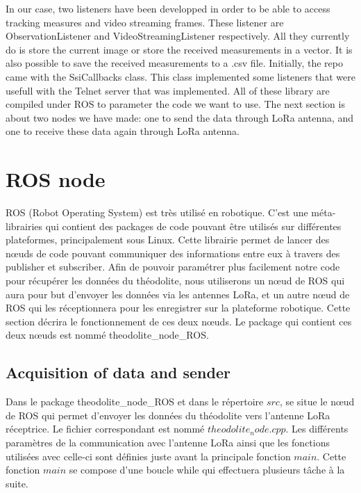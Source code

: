 \documentclass[10pt,letterpaper,oneside]{article}
\begin{document}
In our case, two listeners have been developped in order to be able to access tracking measures and video streaming frames. 
These listener are ObservationListener and VideoStreamingListener respectively. 
All they currently do is store the current image or store the received measurements in a vector. 
It is also possible to save the received measurements to a .csv file.
Initially, the repo came with the SsiCallbacks class. 
This class implemented some listeners that were usefull with the Telnet server that was implemented.
All of these library are compiled under ROS to parameter the code we want to use.
The next section is about two nodes we have made: one to send the data through LoRa antenna, and one to receive these data again through LoRa antenna.

\section{ROS node}
\label{ROS_node}

ROS (Robot Operating System) est très utilisé en robotique.
C'est une méta-librairies qui contient des packages de code pouvant être utilisés sur différentes plateformes, principalement sous Linux.
Cette librairie permet de lancer des nœuds de code pouvant communiquer des informations entre eux à travers des publisher et subscriber.
Afin de pouvoir paramétrer plus facilement notre code pour récupérer les données du théodolite, nous utiliserons un nœud de ROS qui aura pour but d'envoyer les données via les antennes LoRa, et un autre nœud de ROS qui les réceptionnera pour les enregistrer sur la plateforme robotique.
Cette section décrira le fonctionnement de ces deux nœuds.
Le package qui contient ces deux nœuds est nommé theodolite\_node\_ROS.

\subsection{Acquisition of data and sender}

Dans le package theodolite\_node\_ROS et dans le répertoire $src$, se situe le nœud de ROS qui permet d'envoyer les données du théodolite vers l'antenne LoRa réceptrice.
Le fichier correspondant est nommé $theodolite_node.cpp$.
Les différents paramètres de la communication avec l'antenne LoRa ainsi que les fonctions utilisées avec celle-ci sont définies juste avant la principale fonction $main$.
Cette fonction $main$ se compose d'une boucle while qui effectuera plusieurs tâche à la suite.
\end{document}
